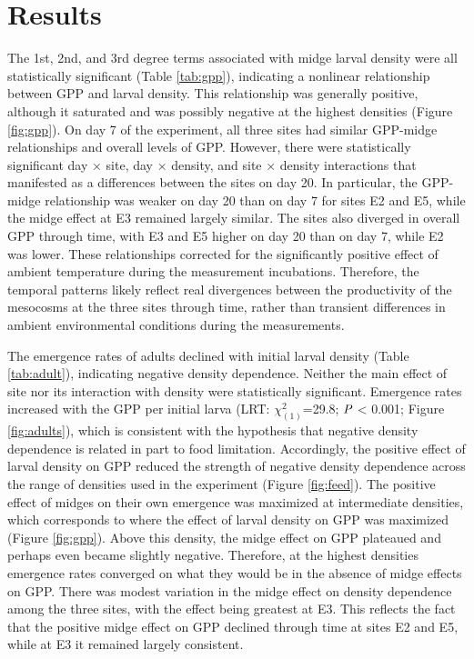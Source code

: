 

\section*{Results}
 
The 1st, 2nd, and 3rd degree terms associated with midge larval density
were all statistically significant (Table \ref{tab:gpp}), 
indicating a nonlinear relationship between GPP and larval density.
This relationship was generally positive, 
although it saturated 
and was possibly negative at the highest densities (Figure \ref{fig:gpp}).
On day 7 of the experiment, 
all three sites had similar GPP-midge relationships and overall levels of GPP.
However, there were statistically significant day $\times$ site, day $\times$ density,
and site $\times$ density interactions that manifested as a differences
between the sites on day 20.
In particular, the GPP-midge relationship was weaker on day 20 than on day 7 for sites
E2 and E5, while the midge effect at E3 remained largely similar.
The sites also diverged in overall GPP through time,
with E3 and E5 higher on day 20 than on day 7,
while E2 was lower.
These relationships corrected for the significantly positive effect 
of ambient temperature during the measurement incubations.
Therefore, the temporal patterns likely reflect real divergences 
between the productivity of the mesocosms at the three sites through time, 
rather than transient differences in ambient environmental conditions during the measurements.

The emergence rates of adults declined with initial larval density 
(Table \ref{tab:adult}), 
indicating negative density dependence.
Neither the main effect of site nor its interaction with density 
were statistically significant.
Emergence rates increased with the GPP per initial larva 
(LRT: $\chi^2_{(1)}$=29.8; $\emph{P}$ < 0.001; Figure \ref{fig:adults}),
which is consistent with the hypothesis that negative density dependence is 
related in part to food limitation.
Accordingly, the positive effect of larval density on GPP reduced the strength of 
negative density dependence across the range of densities 
used in the experiment (Figure \ref{fig:feed}).
The positive effect of midges on their own emergence was maximized at intermediate
densities, 
which corresponds to where the effect of larval density on GPP was maximized 
(Figure \ref{fig:gpp}).
Above this density, 
the midge effect on GPP plateaued and perhaps even became slightly negative. 
Therefore, at the highest densities emergence rates converged on what they would be 
in the absence of midge effects on GPP. 
There was modest variation in the midge effect on density dependence among the three sites,
with the effect being greatest at E3.
This reflects the fact that the positive midge effect on GPP declined through time
at sites E2 and E5, while at E3 it remained largely consistent. 

